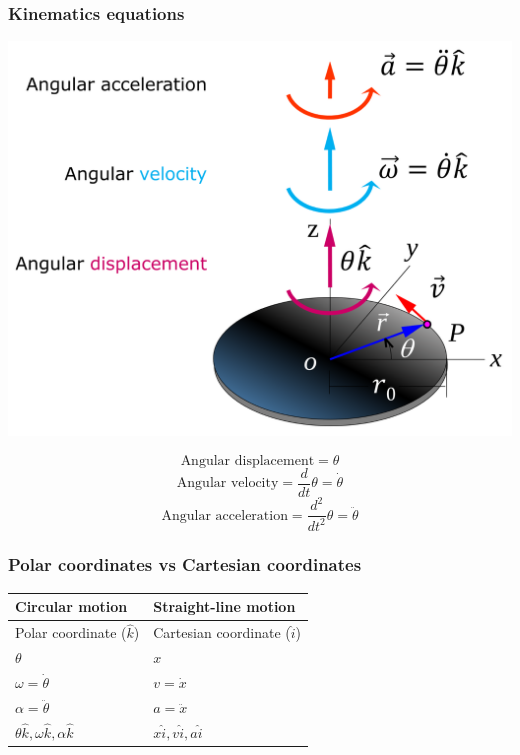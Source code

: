 \documentclass[11pt]{article}
\begin{document}
\subsubsection{Kinematics equations}
\label{sec:org63a9dec}
\begin{center}
\includegraphics[width=.9\linewidth]{./images/polar-coordinates-kinematics-equations.png}
\end{center}
\[\text{Angular displacement} = \theta\]
\[\text{Angular velocity} = \frac{d}{dt} \theta = \dot{\theta}\]
\[\text{Angular acceleration} = \frac{d^2}{dt^2} \theta = \ddot{\theta}\]

\subsubsection{Polar coordinates vs Cartesian coordinates}
\label{sec:orge9b23db}
\begin{center}
\begin{tabular}{l|l}
Circular motion & Straight-line motion\\[0pt]
\hline
Polar coordinate (\(\hat{k}\)) & Cartesian coordinate (\(\hat{i}\))\\[0pt]
\(\theta\) & \(x\)\\[0pt]
\(\omega = \dot{\theta}\) & \(v = \dot{x}\)\\[0pt]
\(\alpha = \ddot{\theta}\) & \(a = \ddot{x}\)\\[0pt]
\(\theta \hat{k}, \omega \hat{k}, \alpha \hat{k}\) & \(x \hat{i}, v \hat{i}, a \hat{i}\)\\[0pt]
\end{tabular}
\end{center}
\end{document}
